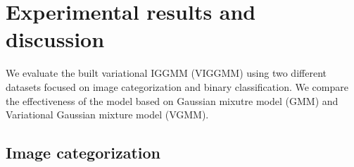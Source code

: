 \documentclass[letterpaper]{article}
\begin{document}
\section{Experimental results and discussion}
We evaluate the built variational IGGMM (VIGGMM) using two different datasets focused on
image categorization and binary classification. We compare the effectiveness of the
model based on Gaussian mixutre model (GMM) and Variational Gaussian mixture model (VGMM).
\subsection{Image categorization}
\end{document}
